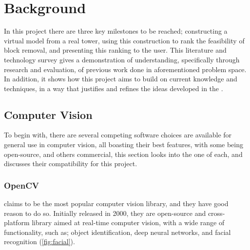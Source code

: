 

\chapter{Background}\label{chap:background}

In this project there are three key milestones to be reached; constructing a virtual model from a real \jenga{} tower, using this construction to rank the feasibility of block removal, and presenting this ranking to the user. This literature and technology survey gives a demonstration of understanding, specifically through research and evaluation, of previous work done in aforementioned problem space. In addition, it shows how this project aims to build on current knowledge and techniques, in a way that justifies and refines the ideas developed in the .

\section{Computer Vision}

To begin with, there are several competing software choices are available for general use in computer vision, all boasting their best features, with some being open-source, and others commercial, this section looks into the one of each, and discusses their compatibility for this project.

\subsection{OpenCV}

\citet{opencv} claims to be the most popular computer vision library, and they have good reason to do so. Initially released in 2000, they are open-source and cross-platform library aimed at real-time computer vision, with a wide range of functionality, such as; object identification, deep neural networks, and facial recognition (\cref{fig:facial}).

